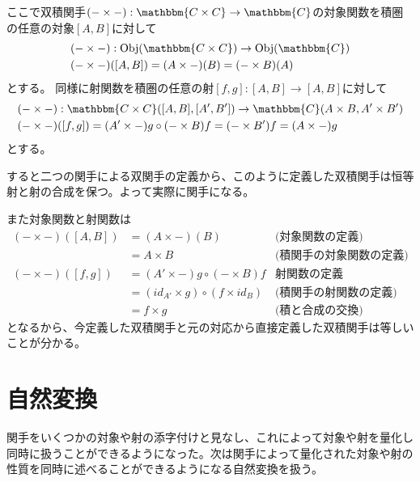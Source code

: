 \documentclass[uplatex,dvipdfmx]{jsarticle}
\newcommand{\cat}[1]{\mathbbm{#1}}
\newcommand{\arrow}{\rightarrow}
\newcommand{\functor}[3]{#1:\cat{#2}\arrow \cat{#3}}
\newcommand{\obj}[1]{\mathrm{Obj}(\cat{#1})}
\newcommand{\mor}[3]{#1:#2\arrow #3}
\newcommand{\arset}[3]{\cat{#1}(#2,#3)}
\newcommand{\pcobj}[1]{[#1]}
\numberwithin{proof}{subsection}
\begin{document}
	ここで双積関手$\functor{(-\times -)}{C\times C}{C}$の対象関数を積圏の任意の対象$\pcobj{A,B}$に対して
	\begin{align*}
		\mor{&(-\times -)}{\obj{C\times C}}{\obj{C}}\\
		&(-\times -)(\pcobj{A,B})=(A\times -)(B)=(-\times B)(A)
	\end{align*}
	とする。
	同様に射関数を積圏の任意の射$\mor{\pcobj{f,g}}{\pcobj{A,B}}{\pcobj{A,B}}$に対して
	\begin{align*}
		\mor{&(-\times -)}{\arset{C\times C}{\pcobj{A,B}}{\pcobj{A',B'}}}{\arset{C}{A\times B}{A'\times B'}}\\
		&(-\times -)(\pcobj{f,g})=(A'\times -)g\circ (-\times B)f=(-\times B')f=(A\times -)g
	\end{align*}
	とする。

	すると二つの関手による双関手の定義から、このように定義した双積関手は恒等射と射の合成を保つ。よって実際に関手になる。

	また対象関数と射関数は
	\begin{align*}
		(-\times -)(\pcobj{A,B})&=(A\times -)(B)&\text{(対象関数の定義)}\\
		&=A\times B&\text{(積関手の対象関数の定義)}\\
		(-\times -)(\pcobj{f,g})&=(A'\times -)g\circ (-\times B)f&\text{射関数の定義}\\
		&=(id_{A'}\times g)\circ(f\times id_B)&\text{(積関手の射関数の定義)}\\
		&=f\times g&\text{(積と合成の交換)}
	\end{align*}
	となるから、今定義した双積関手と元の対応から直接定義した双積関手は等しいことが分かる。

	\section{自然変換}
  関手をいくつかの対象や射の添字付けと見なし、これによって対象や射を量化し同時に扱うことができるようになった。次は関手によって量化された対象や射の性質を同時に述べることができるようになる自然変換を扱う。
\end{document}
